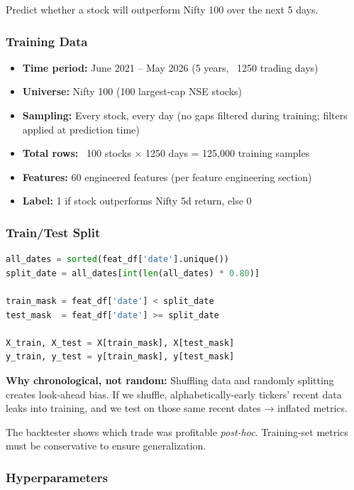\documentclass[11pt,a4paper]{article}
\begin{document}
Predict whether a stock will outperform Nifty 100 over the next 5 days.

\subsubsection{Training Data}

\begin{itemize}
    \item \textbf{Time period:} June 2021 – May 2026 (5 years, ~1250 trading days)
    \item \textbf{Universe:} Nifty 100 (100 largest-cap NSE stocks)
    \item \textbf{Sampling:} Every stock, every day (no gaps filtered during training; filters applied at prediction time)
    \item \textbf{Total rows:} ~100 stocks × 1250 days = 125,000 training samples
    \item \textbf{Features:} 60 engineered features (per feature engineering section)
    \item \textbf{Label:} 1 if stock outperforms Nifty 5d return, else 0
\end{itemize}

\subsubsection{Train/Test Split}

\begin{lstlisting}[language=Python, caption=Chronological Date-Based Split]
all_dates = sorted(feat_df['date'].unique())
split_date = all_dates[int(len(all_dates) * 0.80)]

train_mask = feat_df['date'] < split_date
test_mask  = feat_df['date'] >= split_date

X_train, X_test = X[train_mask], X[test_mask]
y_train, y_test = y[train_mask], y[test_mask]
\end{lstlisting}

\textbf{Why chronological, not random:} Shuffling data and randomly splitting creates look-ahead bias. If we shuffle, alphabetically-early tickers' recent data leaks into training, and we test on those same recent dates → inflated metrics.

The backtester shows which trade was profitable \emph{post-hoc}. Training-set metrics must be conservative to ensure generalization.

\subsubsection{Hyperparameters}
\end{document}
